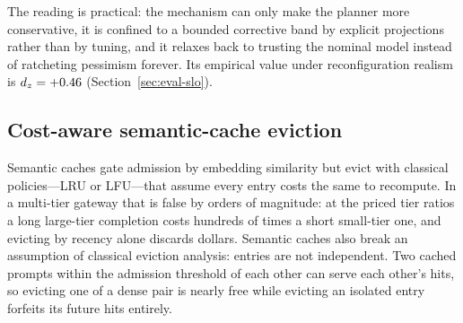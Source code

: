 The reading is practical: the mechanism can only make the planner more
conservative, it is confined to a bounded corrective band by explicit
projections rather than by tuning, and it relaxes back to trusting the
nominal model instead of ratcheting pessimism forever. Its empirical value
under reconfiguration realism is $d_z = +0.46$
(Section~\ref{sec:eval-slo}).

\subsection{Cost-aware semantic-cache eviction}
\label{sec:eviction}

Semantic caches gate admission by embedding similarity but evict with
classical policies---LRU or LFU---that assume every entry costs the same to
recompute. In a multi-tier gateway that is false by orders of magnitude: at
the priced tier ratios a long large-tier completion costs hundreds of times
a short small-tier one, and evicting by recency alone discards dollars.
Semantic caches also break an assumption of classical eviction analysis:
entries are not independent. Two cached prompts within the admission
threshold of each other can serve each other's hits, so evicting one of a
dense pair is nearly free while evicting an isolated entry forfeits its
future hits entirely.

